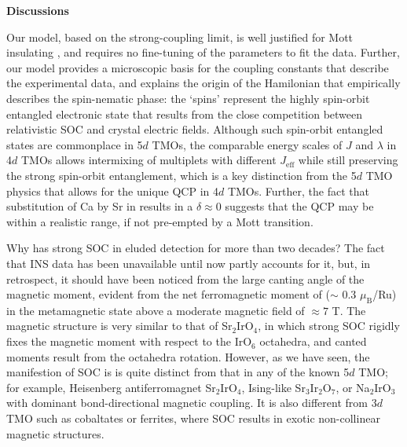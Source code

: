 \vspace{ 10 pt}
\noindent
{\bf Discussions}

\noindent
Our model, based on the strong-coupling limit, is well justified for Mott insulating \CROns, and requires no fine-tuning of the parameters to fit the data. Further, our model provides a microscopic basis for the coupling constants that describe the experimental data, and explains the origin of the Hamilonian that empirically describes the spin-nematic phase: the `spins' represent the highly spin-orbit entangled electronic state that results from the close competition between relativistic SOC and crystal electric fields. Although such spin-orbit entangled states are commonplace in 5$d$ TMOs, the comparable energy scales of $J$ and $\lambda$ in 4$d$ TMOs allows intermixing of multiplets with different $J_{\mathrm {eff}}$ while still preserving the strong spin-orbit entanglement, which is a key distinction from the 5$d$ TMO physics that allows for the unique QCP in 4$d$ TMOs. Further, the fact that substitution of Ca by Sr in \CRO  results in a $\delta$$\approx$0 \cite{Nakatsuji_2000}suggests that the QCP may be within a realistic range, if not pre-empted by a Mott transition\cite{Nakatsuji_2000_2}.

Why has strong SOC in \CRO eluded detection for more than two decades? The fact that INS data has been unavailable until now partly accounts for it, but, in retrospect, it should have been noticed from the large canting angle of the magnetic moment, evident from the net ferromagnetic moment of ($\sim$ 0.3 $\mu_{\mathrm{B}}$/Ru) in the metamagnetic state above a moderate magnetic field of $\approx7$ T. The magnetic structure is very similar to that of Sr$_2$IrO$_4$, in which strong SOC rigidly fixes the magnetic moment with respect to the IrO$_6$ octahedra, and canted moments result from the octahedra rotation. However, as we have seen, the manifestion of SOC is \CRO is quite distinct from that in any of the known 5$d$ TMO; for example, Heisenberg antiferromagnet Sr$_2$IrO$_4$,  Ising-like Sr$_3$Ir$_2$O$_7$, or Na$_2$IrO$_3$ with dominant bond-directional magnetic coupling. It is also different from 3$d$ TMO such as cobaltates or ferrites, where SOC results in exotic non-collinear magnetic structures.
  
